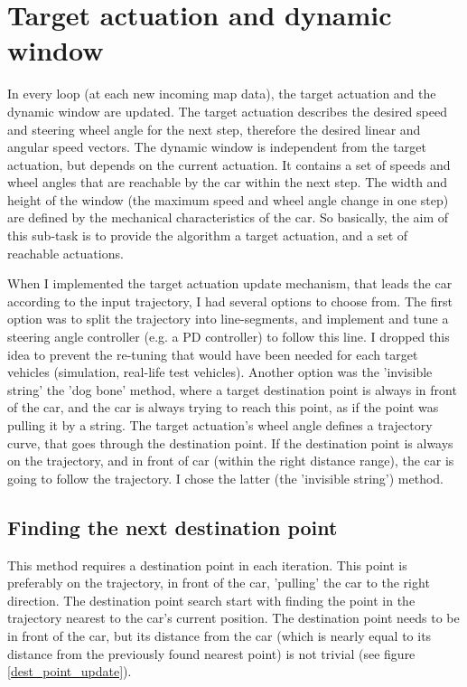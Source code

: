 \section{Target actuation and dynamic window}
\label{chap:target_actuation_and_dynamic_window}
In every loop (at each new incoming map data), the target actuation and the dynamic window are updated. The target actuation describes the desired speed and steering wheel angle for the next step, therefore the desired linear and angular speed vectors. The dynamic window is independent from the target actuation, but depends on the current actuation. It contains a set of speeds and wheel angles that are reachable by the car within the next step. The width and height of the window (the maximum speed and wheel angle change in one step) are defined by the mechanical characteristics of the car. So basically, the aim of this sub-task is to provide the algorithm a target actuation, and a set of reachable actuations.

When I implemented the target actuation update mechanism, that leads the car according to the input trajectory, I had several options to choose from. The first option was to split the trajectory into line-segments, and implement and tune a steering angle controller (e.g. a PD controller) to follow this line. I dropped this idea to prevent the re-tuning that would have been needed for each target vehicles (simulation, real-life test vehicles). Another option was the 'invisible string' the 'dog bone' method, where a target destination point is always in front of the car, and the car is always trying to reach this point, as if the point was pulling it by a string. The target actuation's wheel angle defines a trajectory curve, that goes through the destination point. If the destination point is always on the trajectory, and in front of car (within the right distance range), the car is going to follow the trajectory. I chose the latter (the 'invisible string') method.

\subsection{Finding the next destination point}
This method requires a destination point in each iteration. This point is preferably on the trajectory, in front of the car, 'pulling' the car to the right direction. The destination point search start with finding the point in the trajectory nearest to the car's current position. The destination point needs to be in front of the car, but its distance from the car (which is nearly equal to its distance from the previously found nearest point) is not trivial (see figure \ref{dest_point_update}).

